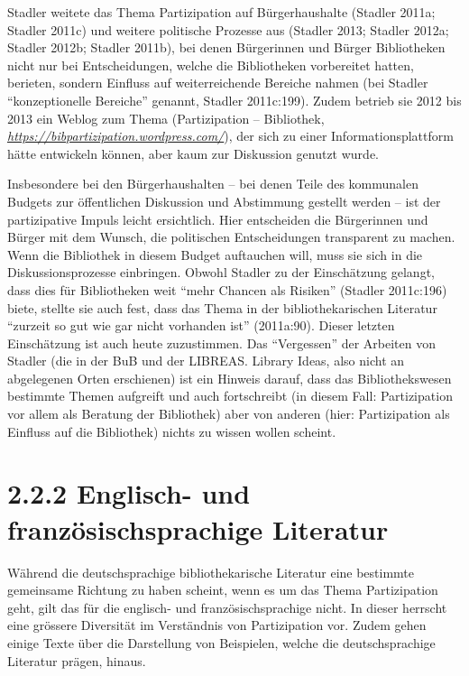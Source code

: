 \documentclass[a4paper,
fontsize=11pt,
oneside,
numbers=noperiodatend,
parskip=half-,
bibliography=totoc,
final
]{scrartcl}
\begin{document}
Stadler weitete das Thema Partizipation auf Bürgerhaushalte (Stadler
2011a; Stadler 2011c) und weitere politische Prozesse aus (Stadler 2013;
Stadler 2012a; Stadler 2012b; Stadler 2011b), bei denen Bürgerinnen und
Bürger Bibliotheken nicht nur bei Entscheidungen, welche die
Bibliotheken vorbereitet hatten, berieten, sondern Einfluss auf
weiterreichende Bereiche nahmen (bei Stadler \enquote{konzeptionelle
Bereiche} genannt, Stadler 2011c:199). Zudem betrieb sie 2012 bis 2013
ein Weblog zum Thema (Partizipation -- Bibliothek,
\href{https://bibpartizipation.wordpress.com/}{\emph{https://bibpartizipation.wordpress.com/}}),
der sich zu einer Informationsplattform hätte entwickeln können, aber
kaum zur Diskussion genutzt wurde.

Insbesondere bei den Bürgerhaushalten -- bei denen Teile des kommunalen
Budgets zur öffentlichen Diskussion und Abstimmung gestellt werden --
ist der partizipative Impuls leicht ersichtlich. Hier entscheiden die
Bürgerinnen und Bürger mit dem Wunsch, die politischen Entscheidungen
transparent zu machen. Wenn die Bibliothek in diesem Budget auftauchen
will, muss sie sich in die Diskussionsprozesse einbringen. Obwohl
Stadler zu der Einschätzung gelangt, dass dies für Bibliotheken weit
\enquote{mehr Chancen als Risiken} (Stadler 2011c:196) biete, stellte
sie auch fest, dass das Thema in der bibliothekarischen Literatur
\enquote{zurzeit so gut wie gar nicht vorhanden ist} (2011a:90). Dieser
letzten Einschätzung ist auch heute zuzustimmen. Das \enquote{Vergessen}
der Arbeiten von Stadler (die in der BuB und der LIBREAS. Library Ideas,
also nicht an abgelegenen Orten erschienen) ist ein Hinweis darauf, dass
das Bibliothekswesen bestimmte Themen aufgreift und auch fortschreibt
(in diesem Fall: Partizipation vor allem als Beratung der Bibliothek)
aber von anderen (hier: Partizipation als Einfluss auf die Bibliothek)
nichts zu wissen wollen scheint.

\section*{2.2.2 Englisch- und französischsprachige
Literatur}\label{englisch--und-franzuxf6sischsprachige-literatur}

Während die deutschsprachige bibliothekarische Literatur eine bestimmte
gemeinsame Richtung zu haben scheint, wenn es um das Thema Partizipation
geht, gilt das für die englisch- und französischsprachige nicht. In
dieser herrscht eine grössere Diversität im Verständnis von
Partizipation vor. Zudem gehen einige Texte über die Darstellung von
Beispielen, welche die deutschsprachige Literatur prägen, hinaus.
\end{document}
